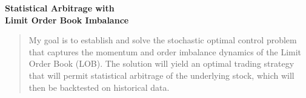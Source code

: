 \documentclass[12pt]{article}
\begin{document}
\mymascheader
\pagestyle{plain}
{\begin{center} {\large {\bf Statistical Arbitrage with \\  Limit Order Book Imbalance}} \end{center}}
\bigskip



\begin{quote}
My goal is to establish and solve the stochastic optimal control problem that 
captures the momentum and order imbalance dynamics of the Limit Order Book 
(LOB). The solution will yield an optimal trading strategy that will permit
statistical arbitrage of the underlying stock, which will then be backtested on
historical data.
\end{quote}
\end{document}
